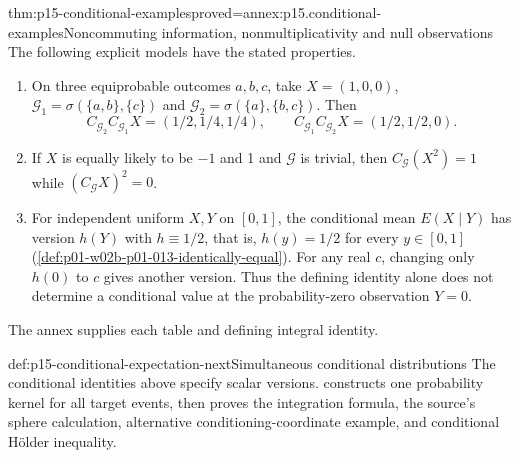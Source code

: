 \begin{hbtheorem}{thm:p15-conditional-examples}{proved=annex:p15.conditional-examples}{Noncommuting information, nonmultiplicativity and null observations}
The following explicit models have the stated properties.
\begin{enumerate}
\item On three equiprobable outcomes \(a,b,c\), take \(X=(1,0,0)\),
      \(\mathcal G_1=\sigma(\{a,b\},\{c\})\) and
      \(\mathcal G_2=\sigma(\{a\},\{b,c\})\). Then
      \[
      C_{\mathcal G_2}C_{\mathcal G_1}X=(1/2,1/4,1/4),\qquad
      C_{\mathcal G_1}C_{\mathcal G_2}X=(1/2,1/2,0).
      \]
\item If \(X\) is equally likely to be \(-1\) and 1 and \(\mathcal G\)
      is trivial, then \(C_{\mathcal G}(X^2)=1\) while
      \((C_{\mathcal G}X)^2=0\).
\item For independent uniform \(X,Y\) on \([0,1]\), the conditional
      mean \(E(X\mid Y)\) has version \(h(Y)\) with \(h\equiv1/2\), that is,
      \(h(y)=1/2\) for every \(y\in[0,1]\)
      (\cref{def:p01-w02b-p01-013-identically-equal}).
      For any real \(c\), changing only \(h(0)\) to \(c\) gives another
      version. Thus the defining identity alone does not determine a
      conditional value at the probability-zero observation \(Y=0\).
\end{enumerate}
The annex supplies each table and defining integral identity.
\end{hbtheorem}

\begin{proofboundary}{def:p15-conditional-expectation-next}{Simultaneous conditional distributions}
The conditional identities above specify scalar versions.
 constructs one probability kernel
for all target events, then proves the integration formula, the source's
sphere calculation, alternative conditioning-coordinate example, and
conditional H\"older inequality.
\end{proofboundary}
